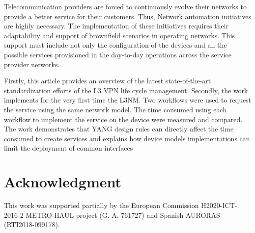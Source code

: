 \documentclass[conference]{IEEEtran}
\begin{document}
Telecommunication providers are forced to continuously evolve their networks to provide a better service for their customers. Thus, Network automation initiatives are highly necessary.  The implementation of these initiatives requires their adaptability and support of brownfield scenarios in operating networks. This support must include not only the configuration of the devices and all the possible services provisioned in the day-to-day operations across the service provider networks. 

Firstly, this article provides an overview of the latest state-of-the-art standardization efforts of the L3 VPN life cycle management. Secondly, the work implements for the very first time the L3NM. Two workflows were used to request the service using the same network model. The time consumed using each workflow to implement the service on the device were measured and compared. The work demonstrates that YANG design rules can directly affect the time consumed to create services and explains how device models implementations can limit the deployment of common interfaces

\section*{Acknowledgment}
This work was supported partially by the European Commission H2020-ICT-2016-2 METRO-HAUL project (G. A. 761727) and Spanish AURORAS (RTI2018-099178).



\end{document}
